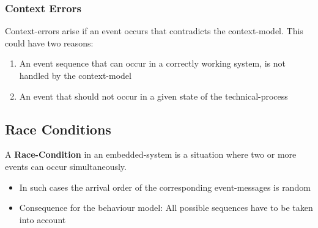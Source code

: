\hypertarget{context-errors}{%
\subsubsection{Context Errors}\label{context-errors}}

Context-errors arise if an event occurs that contradicts the
context-model. This could have two reasons:

\begin{enumerate}
\def\labelenumi{\arabic{enumi}.}
\tightlist
\item
  An event sequence that can occur in a correctly working system, is not
  handled by the context-model
\item
  An event that should not occur in a given state of the
  technical-process
\end{enumerate}

\hypertarget{race-conditions}{%
\subsection{Race Conditions}\label{race-conditions}}

A \textbf{Race-Condition} in an embedded-system is a situation where two
or more events can occur simultaneously.

\begin{itemize}
\tightlist
\item
  In such cases the arrival order of the corresponding event-messages is
  random
\item
  Consequence for the behaviour model: All possible sequences have to be
  taken into account
\end{itemize}

\clearpage